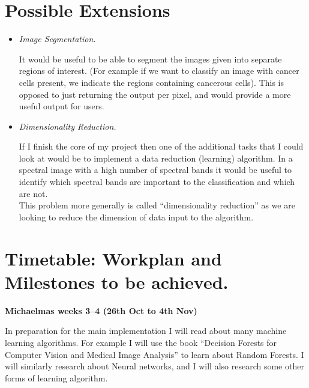 \documentclass[12pt,a4paper,twoside]{article}
\begin{document}
\section*{Possible Extensions}

\begin{itemize}

    \item
    {\em Image Segmentation.}

    It would be useful to be able to segment the images given into separate 
    regions of interest. (For example if we want to classify an image with 
    cancer cells present, we indicate the regions containing cancerous cells).
    This is opposed to just returning the output per pixel, and would provide 
    a more useful output for users.

    \item 
    {\em Dimensionality Reduction.}

    If I finish the core of my project then one of the additional tasks that I 
    could look at would be to implement a data reduction (learning) algorithm. 
    In a spectral image with a high number of spectral bands it would be useful 
    to identify which spectral bands are important to the classification and 
    which are not. \\

    This problem more generally is called ``dimensionality reduction'' as we are 
    looking to reduce the dimension of data input to the algorithm.

\end{itemize}



\clearpage
\section*{Timetable: Workplan and Milestones to be achieved.}

{\bf Michaelmas weeks 3--4 (26th Oct to 4th Nov)} 

In preparation for the main implementation I will read about many machine 
learning algorithms. For example I will use the book ``Decision Forests for 
Computer Vision and Medical Image Analysis'' to learn about Random Forests. I 
will similarly research about Neural networks, and I will also research some 
other forms of learning algorithm. \\
\end{document}
